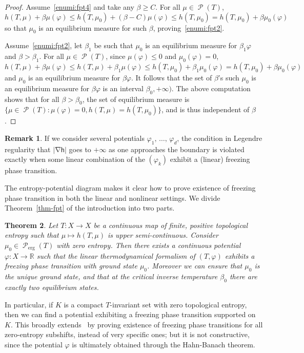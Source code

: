 \documentclass[10pt]{amsart}
\newtheorem{theo}{Theorem}[section]
\theoremstyle{definition}\newtheorem{defi}[theo]{Definition}\newtheorem{rema}[theo]{Remark}\newtheorem{exam}[theo]{Example}\newtheorem{exem}[theo]{Example}\newtheorem{nota}[theo]{Notation}
\theoremstyle{plain}
\theoremstyle{plain}
\newcommand\erg{\mathrm{erg}}
\newcommand\Prob{{\operatorname{\mathscr{P}}}}
\newcommand{\grad}{\operatorname{\nabla}}
\newcommand{\hf}{\mathsf{h}}
\newcommand{\pot}{\varphi}
\newcounter{In}
\newcommand*\8{\infty}
\newcommand\RR{\mathbb{R}}
\begin{document}
\begin{proof}
Assume~\eqref{enumi:fpt4} and take any $\beta\ge C$. For all $\mu\in\Prob(T)$,
\[
h(T,\mu)+\beta\mu(\pot) \le h(T,\mu_0) + (\beta-C) \mu(\pot) \le h(T,\mu_0) = h(T,\mu_0)+\beta\mu_0(\pot)
\]
so that $\mu_0$ is an equilibrium measure for such $\beta$, proving~\eqref{enumi:fpt2}.

Assume~\eqref{enumi:fpt2}, let $\beta_1$ be such that $\mu_0$ is an equilibrium measure for $\beta_1\pot$ and $\beta>\beta_1$. For all $\mu\in\Prob(T)$, since $\mu(\pot)\le 0$ and $\mu_0(\pot)=0$,
\[
h(T,\mu)+\beta\mu(\pot) \le h(T,\mu)+\beta_1\mu(\pot) \le h(T,\mu_0)+\beta_1\mu_0(\pot) = h(T,\mu_0)+\beta\mu_0(\pot)
\]
and $\mu_0$ is an equilibrium measure for $\beta\pot$. It follows that the set of $\beta$'s such $\mu_0$ is an equilibrium measure for $\beta\pot$ is an interval $\beta_0,+\infty)$. The above computation shows that for all $\beta>\beta_0$, the set of equilibrium measure is $\{\mu\in\Prob(T) \colon \mu(\pot)=0, h(T,\mu)=h(T,\mu_0) \}$, and is thus independent of $\beta$.
\end{proof}

\begin{rema}
If we consider several potentials $\pot_1,\,\dots,\,\pot_d$, the condition in Legendre regularity that $\lvert\grad \hf\rvert$ goes to $+\infty$ as one approaches the boundary is violated exactly when some linear combination of the $(\pot_k)$ exhibit a (linear) freezing phase transition.
\end{rema}

The entropy-potential diagram makes it {clear} how to prove existence of freezing phase transition in both the linear and nonlinear settings. We divide Theorem~\ref{thm-fpt} of the introduction into two parts.

\begin{theo}\label{thm-fpt-linear}
Let $T:X\to X$ be a continuous map of finite, positive topological entropy such that $\mu\mapsto h(T,\mu)$ is upper semi-continuous. Consider $\mu_0\in\Prob_\erg(T)$ with zero entropy. Then there exists a continuous potential $\pot:X\to \RR$ such that the linear thermodynamical formalism of $(T,\pot)$ exhibits a freezing phase transition with ground state $\mu_0$. Moreover we can ensure that $\mu_0$ is the unique ground state, and that at the critical inverse temperature $\beta_0$ there are exactly two equilibrium states.
\end{theo}

In particular, if $K$ is a compact $T$-invariant {set} with zero topological entropy, then we can find a potential exhibiting a freezing phase transition supported on $K$. This broadly extends~\cite{Bruin-Leplaideur1, Bruin-Leplaideur2} by proving existence of freezing phase transitions for all zero-entropy subshifts, instead of very specific ones; but it is not constructive, since the potential $\pot$ is ultimately obtained through the Hahn-Banach theorem.
\end{document}
